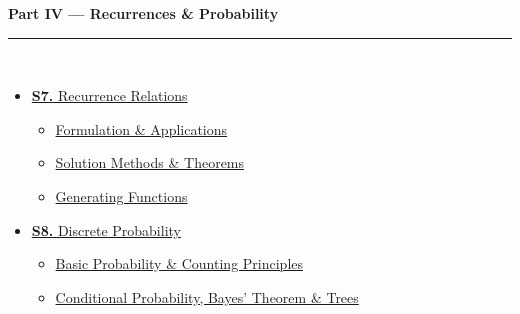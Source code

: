 \documentclass[12pt,a3paper]{article}
\begin{document}
\begin{tcolorbox}[breakable,colback=cD!5,colframe=cD,boxrule=1pt,arc=5pt,
  left=8pt,right=8pt,top=8pt,bottom=8pt,before skip=4pt]
  {\large\bfseries\textcolor{cD}{Part IV --- Recurrences \& Probability}}\\[5pt]
  \textcolor{cD!40}{\rule{\textwidth}{0.4pt}}\\[3pt]
  \small\begin{itemize}[leftmargin=1.2em,itemsep=1pt,label={\textcolor{cD}{$\triangleright$}}]
    \item \hyperref[sec:S7]{\textbf{S7.} Recurrence Relations}
      \begin{itemize}[leftmargin=1.5em,itemsep=0pt,label={\textcolor{cD}{$\cdot$}}]
        \item \hyperref[sub:s7-recurrence-formulation]{Formulation \& Applications}
        \item \hyperref[sub:s7-recurrence-solving]{Solution Methods \& Theorems}
        \item \hyperref[sub:s7-genfunc]{Generating Functions}
      \end{itemize}
    \item \hyperref[sec:S8]{\textbf{S8.} Discrete Probability}
      \begin{itemize}[leftmargin=1.5em,itemsep=0pt,label={\textcolor{cD}{$\cdot$}}]
        \item \hyperref[sub:s8-basicprob]{Basic Probability \& Counting Principles}
        \item \hyperref[sub:s8-conditional]{Conditional Probability, Bayes' Theorem \& Trees}
      \end{itemize}
  \end{itemize}
\end{tcolorbox}
\end{document}
